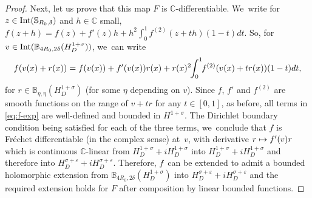 \documentclass[JEP,XML,SOM,Unicode,published]{cedram}
\newcommand\mto{\mathchoice{\longmapsto}{\mapsto}{\mapsto}{\mapsto}}
\theoremstyle{definition}
\let\veps\varepsilon
\providecommand{\Int}[1]{\textup{Int}(#1)}
\begin{document}
\begin{proof}
Next, let us prove that this map $F$ is $\mathbb{C}$-differentiable. We~write for $z\in \Int{\mathbb{S}_{R_0, \delta}}$ and $h\in\mathbb{C}$ small, $f(z+h)=f(z)+f'(z)h+h^2\int_0^1f^{(2)}(z+th)(1-t)dt$. So, for $v\in \Int{\mathbb{B}_{4R_0, 2\delta}(H^{1+\sigma}_D)} $, we~can write
\begin{align}\label{eq:f-exp}
f(v(x)+r(x))=f(v(x))+f'(v(x))r(x)+r(x)^2\hspace*{-1mm}\int_0^1\hspace*{-1mm}f^{(2)}(v(x)+tr(x))(1-t)dt,
\end{align}
for $r\in \mathbb{B}_{\eta, \eta}(H^{1+\sigma}_D)$ (for some $\eta$ depending on $v$). Since $f$, $f'$ and $f^{(2)}$ are smooth functions on the range of $v+tr$ for any $t\in [0,1]$, as before, all terms in \eqref{eq:f-exp} are well-defined and bounded in $H^{1+\sigma}$. The Dirichlet boundary condition being satisfied for each of the three terms, we~conclude that $f$ is Fréchet differentiable (in the complex sense) at~$v$, with derivative $r\mto f'(v)r$ which is continuous $\mathbb{C}$-linear from \hbox{$H^{1+\sigma}_D+iH^{1+\sigma}_D$} into $H^{1+\sigma}_D+iH^{1+\sigma}_D$ and therefore into $H^{\sigma+\veps}_D+iH^{\sigma+\veps}_D$. Therefore, $f$~can be extended to admit a bounded holomorphic extension from $\mathbb{B}_{4R_0, 2\delta}(H_D^{1+\sigma})$ into $H^{\sigma+\veps}_D+iH^{\sigma+\veps}_D$ and the required extension holds for $F$ after composition by linear bounded functions.
\end{proof}
\end{document}
